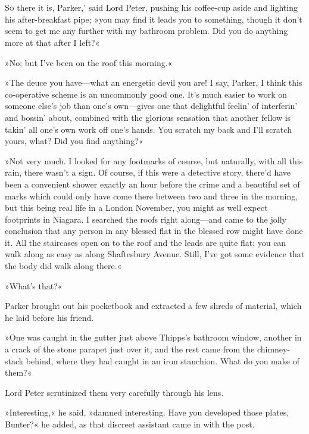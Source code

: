 \chapter[Chapter \thechapter]{}
\lettrine[lines=4,ante=‘—]{S}{o} there it is, Parker,' said Lord Peter, pushing his coffee-cup aside and lighting his after-breakfast pipe; »you may find it leads you to something, though it don't seem to get me any further with my bathroom problem. Did you do anything more at that after I left?«

»No; but I've been on the roof this morning.«

»The deuce you have\allowbreak---\allowbreak what an energetic devil you are! I say, Parker, I think this co-operative scheme is an uncommonly good one. It's much easier to work on someone else's job than one's own\allowbreak---\allowbreak gives one that delightful feelin' of interferin' and bossin' about, combined with the glorious sensation that another fellow is takin' all one's own work off one's hands. You scratch my back and I'll scratch yours, what? Did you find anything?«

»Not very much. I looked for any footmarks of course, but naturally, with all this rain, there wasn't a sign. Of course, if this were a detective story, there'd have been a convenient shower exactly an hour before the crime and a beautiful set of marks which could only have come there between two and three in the morning, but this being real life in a London November, you might as well expect footprints in Niagara. I searched the roofs right along\allowbreak---\allowbreak and came to the jolly conclusion that any person in any blessed flat in the blessed row might have done it. All the staircases open on to the roof and the leads are quite flat; you can walk along as easy as along Shaftesbury Avenue. Still, I've got some evidence that the body did walk along there.«

»What's that?«

Parker brought out his pocketbook and extracted a few shreds of material, which he laid before his friend.

»One was caught in the gutter just above Thipps's bathroom window, another in a crack of the stone parapet just over it, and the rest came from the chimney-stack behind, where they had caught in an iron stanchion. What do you make of them?«

Lord Peter scrutinized them very carefully through his lens.

»Interesting,« he said, »damned interesting. Have you developed those plates, Bunter?« he added, as that discreet assistant came in with the post.

